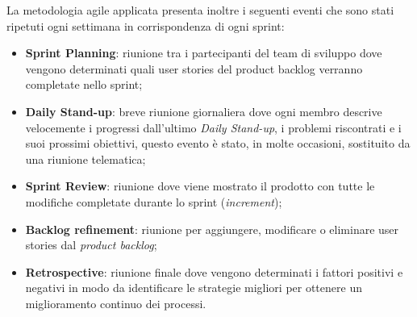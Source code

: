 \noindent
La metodologia agile applicata presenta inoltre i seguenti eventi che sono stati ripetuti ogni settimana in corrispondenza di ogni sprint:
\begin{itemize}
	\item \textbf{Sprint Planning}: riunione tra i partecipanti del team di sviluppo dove vengono determinati quali user stories del product backlog verranno completate nello sprint;
	
	\item \textbf{Daily Stand-up}: breve riunione giornaliera dove ogni membro descrive velocemente i progressi dall'ultimo \emph{Daily Stand-up}, i problemi riscontrati e i suoi prossimi obiettivi, questo evento è stato, in molte occasioni, sostituito da una riunione telematica;
	
	\item \textbf{Sprint Review}: riunione dove viene mostrato il prodotto con tutte le modifiche completate durante lo sprint (\emph{increment});
	
	\item \textbf{Backlog refinement}: riunione per aggiungere, modificare o eliminare user stories dal \emph{product backlog};
	
	\item \textbf{Retrospective}: riunione finale dove vengono determinati i fattori positivi e negativi in modo da identificare le strategie migliori per ottenere un miglioramento continuo dei processi.
\end{itemize}
\noindent

